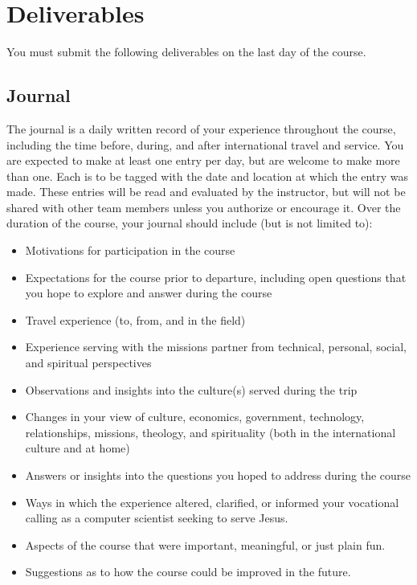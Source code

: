\documentclass{article}
\begin{document}
\section{Deliverables}
\label{sec:orgheadline10}
You must submit the following deliverables on the last day of the course.
\subsection{Journal}
\label{sec:orgheadline8}
The journal is a daily written record of your experience throughout the course, including
the time before, during, and after international travel and service.  You are expected to
make at least one entry per day, but are welcome to make more than one.  Each is to be
tagged with the date and location at which the entry was made.  These entries will be
read and evaluated by the instructor, but will not be shared with other team members
unless you authorize or encourage it.  Over the duration of the course, your journal
should include (but is not limited to):
\begin{itemize}
\item Motivations for participation in the course
\item Expectations for the course prior to departure, including open questions that you hope
to explore and answer during the course
\item Travel experience (to, from, and in the field)
\item Experience serving with the missions partner from technical, personal, social, and
spiritual perspectives
\item Observations and insights into the culture(s) served during the trip
\item Changes in your view of culture, economics, government, technology, relationships,
missions, theology, and spirituality (both in the international culture and at home)
\item Answers or insights into the questions you hoped to address during the course
\item Ways in which the experience altered, clarified, or informed your vocational calling as
a computer scientist seeking to serve Jesus.
\item Aspects of the course that were important, meaningful, or just plain fun.
\item Suggestions as to how the course could be improved in the future.
\end{itemize}
\end{document}
